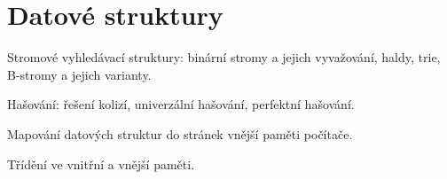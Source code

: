 \newpage
\section{Datové struktury}
\begin{pozadavky}
\begin{pitemize}
\item Stromové vyhledávací struktury: binární stromy a jejich vyvažování, haldy, trie, B-stromy a jejich varianty.
\item Hašování: řešení kolizí, univerzální hašování, perfektní hašování. 
\item Mapování datových struktur do stránek vnější paměti počítače.
\item Třídění ve vnitřní a vnější paměti.
\end{pitemize}
\end{pozadavky}




